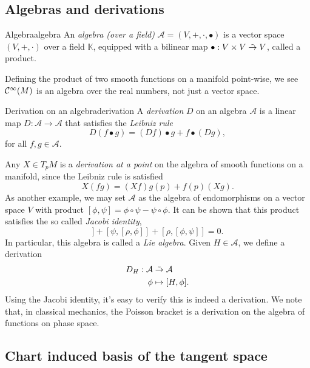 \subsection{Algebras and derivations}
\begin{definition}{Algebra}{algebra}
    An \emph{algebra (over a field)} \(\mathcal{A} = (V, +, \cdot, \bullet)\) is a vector space \((V, +, \cdot)\) over a field \(\mathbb{K}\), equipped with a bilinear map \(\bullet : V \times V \mathrel{\tilde{\to}} V\), called a product.
\end{definition}
Defining the product of two smooth functions on a manifold point-wise, we see \(\mathcal{C}^\infty(M)\) is an algebra over the real numbers, not just a vector space.

\begin{definition}{Derivation on an algebra}{derivation}
    A \emph{derivation} \(D\) on an algebra \(\mathcal{A}\) is a linear map \(D : \mathcal{A} \to \mathcal{A}\) that satisfies the \emph{Leibniz rule}
    \begin{equation*}
        D(f\bullet g) = (Df) \bullet g + f \bullet (Dg),
    \end{equation*}
    for all \(f,g \in \mathcal{A}.\)
\end{definition}
Any \(X \in T_pM\) is a \emph{derivation at a point} on the algebra of smooth functions on a manifold, since the Leibniz rule is satisfied
\begin{equation*}
    X(fg) = (Xf)g(p) + f(p)(Xg).
\end{equation*}
As another example, we may set \(\mathcal{A}\) as the algebra of endomorphisms on a vector space \(V\) with product \([\phi, \psi] = \phi \circ \psi - \psi \circ \phi\). It can be shown that this product satisfies the so called \emph{Jacobi identity},
\begin{equation*}
    [\phi, [\psi, \rho]] + [\psi, [\rho, \phi]] + [\rho, [\phi, \psi]] = 0.
\end{equation*}
In particular, this algebra is called a \emph{Lie algebra}. Given \(H \in \mathcal{A}\), we define a derivation
\begin{align*}
    D_H : \mathcal{A} &\mathrel{\tilde{\to}} \mathcal{A}\\
                \phi &\mapsto [H, \phi].
\end{align*}
Using the Jacobi identity, it's easy to verify this is indeed a derivation. We note that, in classical mechanics, the Poisson bracket is a derivation on the algebra of functions on phase space.

\subsection{Chart induced basis of the tangent space}

